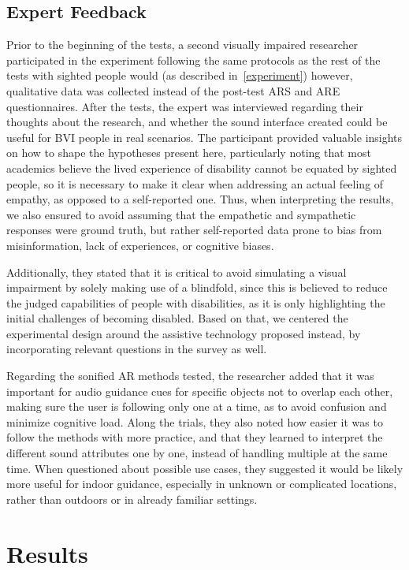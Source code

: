 \documentclass{vgtc}                          %
\begin{document}
\subsection{Expert Feedback}
Prior to the beginning of the tests, a second visually impaired researcher participated in the experiment following the same protocols as the rest of the tests with sighted people would (as described in~\ref{experiment}) however, qualitative data was collected instead of the post-test ARS and ARE questionnaires. After the tests, the expert was interviewed regarding their thoughts about the research, and whether the sound interface created could be useful for BVI people in real scenarios. The participant provided valuable insights on how to shape the hypotheses present here, particularly noting that most academics believe the lived experience of disability cannot be equated by sighted people, so it is necessary to make it clear when addressing an actual feeling of empathy, as opposed to a self-reported one. Thus, when interpreting the results, we also ensured to avoid assuming that the empathetic and sympathetic responses were ground truth, but rather self-reported data prone to bias from misinformation, lack of experiences, or cognitive biases.

Additionally, they stated that it is critical to avoid simulating a visual impairment by solely making use of a blindfold, since this is believed to reduce the judged capabilities of people with disabilities, as it is only highlighting the initial challenges of becoming disabled. Based on that, we centered the experimental design around the assistive technology proposed instead, by incorporating relevant questions in the survey as well.

Regarding the sonified AR methods tested, the researcher added that it was important for audio guidance cues for specific objects not to overlap each other, making sure the user is following only one at a time, as to avoid confusion and minimize cognitive load. Along the trials, they also noted how easier it was to follow the methods with more practice, and that they learned to interpret the different sound attributes one by one, instead of handling multiple at the same time. When questioned about possible use cases, they suggested it would be likely more useful for indoor guidance, especially in unknown or complicated locations, rather than outdoors or in already familiar settings.

\section{Results}
\label{section:results}
\end{document}
